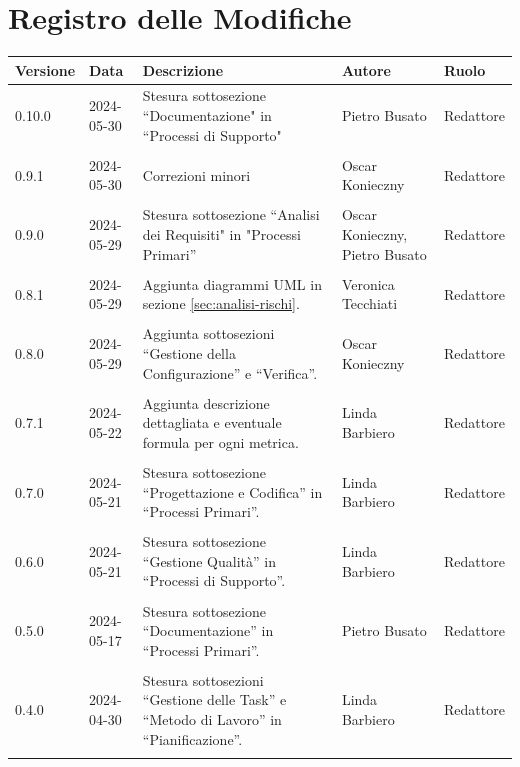 \documentclass[8pt]{article}
\begin{document}
\section*{Registro delle Modifiche}
\begin{table}[ht!]	
	\centering
	\begin{tabular}{p{1.2cm} p{2cm} p{6cm} p{3cm} p{2cm}}
		\toprule
		\textbf{Versione}& \textbf{Data} & \textbf{Descrizione} & \textbf{Autore} & \textbf{Ruolo} \\
		\midrule
		0.10.0 & 2024-05-30 & Stesura sottosezione ``Documentazione" in ``Processi di Supporto" & Pietro Busato & Redattore \\\\
		0.9.1 & 2024-05-30 & Correzioni minori & Oscar Konieczny & Redattore \\\\
		0.9.0 & 2024-05-29 & Stesura sottosezione ``Analisi dei Requisiti" in "Processi Primari'' & Oscar Konieczny, Pietro Busato & Redattore \\\\ 
        0.8.1 & 2024-05-29 & Aggiunta diagrammi UML in sezione \ref{sec:analisi-rischi}. & Veronica Tecchiati & Redattore \\\\
		0.8.0 & 2024-05-29 & Aggiunta sottosezioni ``Gestione della Configurazione'' e ``Verifica''. & Oscar Konieczny & Redattore \\\\
		0.7.1 & 2024-05-22 & Aggiunta descrizione dettagliata e eventuale formula per ogni metrica. & Linda Barbiero & Redattore \\\\ %
		0.7.0 & 2024-05-21 & Stesura sottosezione ``Progettazione e Codifica'' in ``Processi Primari''. & Linda Barbiero & Redattore \\\\ %
		0.6.0 & 2024-05-21 & Stesura sottosezione ``Gestione Qualità'' in ``Processi di Supporto''. & Linda Barbiero & Redattore \\\\ %
		0.5.0 & 2024-05-17 & Stesura sottosezione ``Documentazione'' in ``Processi Primari''. & Pietro Busato & Redattore \\\\ %
		0.4.0 & 2024-04-30 & Stesura sottosezioni ``Gestione delle Task'' e ``Metodo di Lavoro'' in ``Pianificazione''. & Linda Barbiero & Redattore \\\\ %

\end{tabular}
\end{table}
\end{document}
